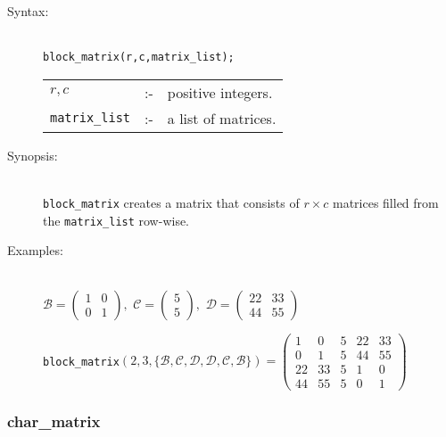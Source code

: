 \begin{description}

\item[Syntax:]\mbox{}\\
\texttt{block\_matrix(r,c,matrix\_list);}\\[2mm]
\begin{tabular}{l l l}
$r,c$          &:-& positive integers. \\
\texttt{matrix\_list} &:-& a list of matrices.
\end{tabular}

\item[Synopsis:]\mbox{}\\
\texttt{block\_matrix} creates a matrix that consists of $r\times c$ matrices
filled from the \texttt{matrix\_list} row-wise.

\item[Examples:]\mbox{}\\
  \(\mathcal{B} = \begin{pmatrix} 1 & 0 \\ 0 & 1 \end{pmatrix}, \,\,
  \mathcal{C} = \begin{pmatrix} 5 \\ 5 \end{pmatrix}, \,\,
  \mathcal{D} = \begin{pmatrix} 22 & 33 \\ 44 & 55 \end{pmatrix}\)

  \texttt{block\_matrix}\((2,3,\{\mathcal{B,C,D,D,C,B}\})  =
  \begin{pmatrix} 1 & 0 & 5 & 22 & 33 \\ 0 & 1 & 5 & 44 & 55 \\
    22 & 33 & 5 & 1 & 0 \\ 44 & 55 & 5 & 0 & 1 \end{pmatrix}\)
\end{description}


\subsubsection{char\_matrix}
\label{linalg:char_matrix}

